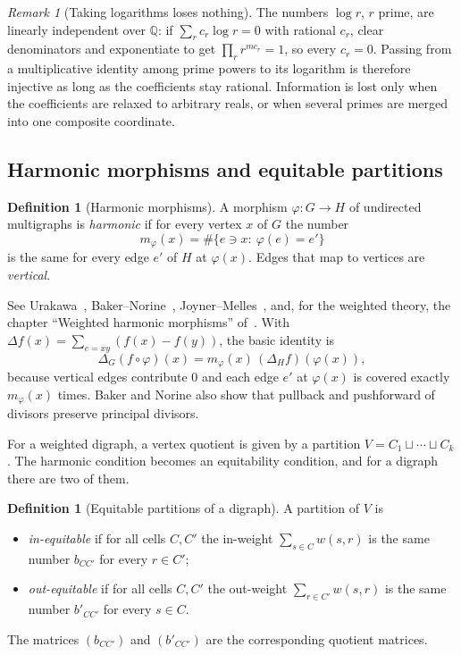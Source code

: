 \documentclass[11pt]{article}
\theoremstyle{definition}
\newtheorem{definition}[theorem]{Definition}
\theoremstyle{remark}
\newtheorem{remark}[theorem]{Remark}
\begin{document}
\begin{remark}[Taking logarithms loses nothing]\label{rem:logs}
The numbers $\log r$, $r$ prime, are linearly independent over $\mathbb Q$:
if $\sum_r c_r\log r=0$ with rational $c_r$, clear denominators and
exponentiate to get $\prod_r r^{mc_r}=1$, so every $c_r=0$.  Passing from a
multiplicative identity among prime powers to its logarithm is therefore
injective as long as the coefficients stay rational.  Information is lost
only when the coefficients are relaxed to arbitrary reals, or when several
primes are merged into one composite coordinate.
\end{remark}

\subsection{Harmonic morphisms and equitable partitions}\label{sec:hm}

\begin{definition}[Harmonic morphisms]
A morphism $\varphi\colon G\to H$ of undirected multigraphs is
\emph{harmonic} if for every vertex $x$ of $G$ the number
\[
m_\varphi(x)=\#\{e\ni x:\ \varphi(e)=e'\}
\]
is the same for every edge $e'$ of $H$ at $\varphi(x)$.  Edges that map to
vertices are \emph{vertical}.
\end{definition}

See Urakawa~\cite{Urakawa}, Baker--Norine~\cite{BN},
Joyner--Melles~\cite{JM2017}, and, for the weighted theory, the chapter
``Weighted harmonic morphisms'' of~\cite{MJappl}.  With
$\Delta f(x)=\sum_{e=xy}(f(x)-f(y))$, the basic identity is
\[
\Delta_G(f\circ\varphi)(x)=m_\varphi(x)\,(\Delta_H f)(\varphi(x)),
\tag{B2}
\]
because vertical edges contribute $0$ and each edge $e'$ at $\varphi(x)$ is
covered exactly $m_\varphi(x)$ times.  Baker and Norine also show that
pullback and pushforward of divisors preserve principal divisors.

For a weighted digraph, a vertex quotient is given by a partition
$V=C_1\sqcup\cdots\sqcup C_k$.  The harmonic condition becomes an
equitability condition, and for a digraph there are two of them.

\begin{definition}[Equitable partitions of a digraph]
A partition of $V$ is
\begin{itemize}[leftmargin=1.5em]
\item \emph{in-equitable} if for all cells $C,C'$ the in-weight
  $\sum_{s\in C}w(s,r)$ is the same number $b_{CC'}$ for every $r\in C'$;
\item \emph{out-equitable} if for all cells $C,C'$ the out-weight
  $\sum_{r\in C'}w(s,r)$ is the same number $b'_{CC'}$ for every $s\in C$.
\end{itemize}
The matrices $(b_{CC'})$ and $(b'_{CC'})$ are the corresponding quotient
matrices.
\end{definition}
\end{document}
